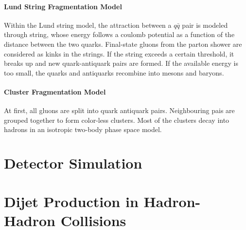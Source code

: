\paragraph{Lund String Fragmentation Model}

Within the Lund string model, the attraction between a $q\bar q$ pair is
modeled through string, whose energy follows a coulomb potential as a function
of the distance between the two quarks. Final-state gluons from the parton
shower are considered as kinks in the strings. If the string exceeds a certain
threshold, it breaks up and new quark-antiquark pairs are formed. If the
available energy is too small, the quarks and antiquarks recombine into mesons
and baryons.

\paragraph{Cluster Fragmentation Model}

At first, all gluons are split into quark antiquark pairs. Neighbouring pais are
grouped together to form color-less clusters. Most of the clusters decay into
hadrons in an isotropic two-body phase space model.

\section{Detector Simulation}

\section{Dijet Production in Hadron-Hadron Collisions}
